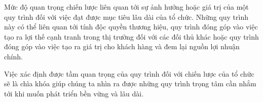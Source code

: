 Mức độ quan trọng chiến lược liên quan tới sự ảnh hưởng hoặc giá trị của một quy trình đối với việc đạt được mục tiêu lâu dài của tổ chức. Những quy trình này có thể liên quan tới tính độc quyền thương hiệu, quy trình đóng góp vào việc tạo ra lợi thế cạnh tranh trong thị trường đối với các đối thủ khác hoặc quy trình đóng góp vào việc tạo ra giá trị cho khách hàng và đem lại nguồn lợi nhuận chính.

Việc xác định được tầm quan trọng của quy trình đối với chiến lược của tổ chức sẽ là chìa khóa giúp chúng ta nhìn ra được những quy trình trọng tâm cần nhắm tới khi muốn phát triển bền vững và lâu dài.